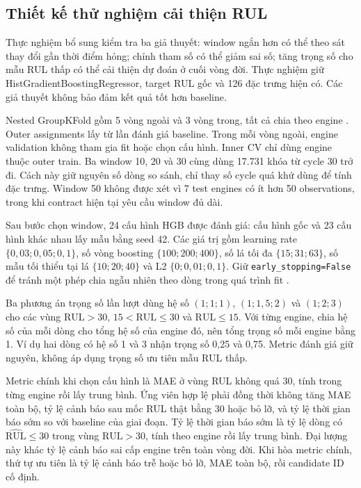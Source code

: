 \subsection{Thiết kế thử nghiệm cải thiện RUL}
\label{sec:rul-improvement-method}

Thực nghiệm bổ sung kiểm tra ba giả thuyết: window ngắn hơn có thể theo sát
thay đổi gần thời điểm hỏng; chỉnh tham số có thể giảm sai số; tăng trọng số
cho mẫu RUL thấp có thể cải thiện dự đoán ở cuối vòng đời. Thực nghiệm giữ
HistGradientBoostingRegressor, target RUL gốc và 126 đặc trưng hiện có.
Các giả thuyết không bảo đảm kết quả tốt hơn baseline.

Nested GroupKFold gồm 5 vòng ngoài và 3 vòng trong, tất cả chia theo engine
\cite{sklearnNestedCV2026,sklearnGroupedCV}.
Outer assignments lấy từ lần đánh giá baseline. Trong mỗi vòng ngoài, engine
validation không tham gia fit hoặc chọn cấu hình. Inner CV chỉ dùng engine
thuộc outer train. Ba window 10, 20 và 30 cùng dùng 17.731 khóa từ cycle 30
trở đi. Cách này giữ nguyên số dòng so sánh, chỉ thay số cycle quá khứ dùng
để tính đặc trưng. Window 50 không được xét vì 7 test engines có ít hơn 50
observations, trong khi contract hiện tại yêu cầu window đủ dài.

Sau bước chọn window, 24 cấu hình HGB được đánh giá: cấu hình gốc và 23 cấu
hình khác nhau lấy mẫu bằng seed 42. Các giá trị gồm learning rate
$\{0{,}03;0{,}05;0{,}1\}$, số vòng boosting $\{100;200;400\}$, số lá tối đa
$\{15;31;63\}$, số mẫu tối thiểu tại lá $\{10;20;40\}$ và L2
$\{0;0{,}01;0{,}1\}$. Giữ \texttt{early\_stopping=False} để tránh một phép
chia ngẫu nhiên theo dòng trong quá trình fit \cite{sklearnHGBAPI2026}.

Ba phương án trọng số lần lượt dùng hệ số $(1;1;1)$, $(1;1{,}5;2)$ và
$(1;2;3)$ cho các vùng $\mathrm{RUL}>30$, $15<\mathrm{RUL}\leq30$ và
$\mathrm{RUL}\leq15$. Với từng engine, chia hệ số của mỗi dòng cho tổng hệ số
của engine đó, nên tổng trọng số mỗi engine bằng 1. Ví dụ hai dòng có hệ số
1 và 3 nhận trọng số 0,25 và 0,75. Metric đánh giá giữ nguyên, không áp dụng
trọng số ưu tiên mẫu RUL thấp.

Metric chính khi chọn cấu hình là MAE ở vùng RUL không quá 30, tính trong
từng engine rồi lấy trung bình. Ứng viên hợp lệ phải đồng thời không tăng
MAE toàn bộ, tỷ lệ cảnh báo sau mốc RUL thật bằng 30 hoặc bỏ lỡ, và tỷ lệ thời
gian báo sớm so với baseline của giai đoạn. Tỷ lệ thời gian báo sớm là tỷ lệ
dòng có $\widehat{\mathrm{RUL}}\leq30$ trong vùng $\mathrm{RUL}>30$, tính theo
engine rồi lấy trung bình. Đại lượng này khác tỷ lệ cảnh báo sai cấp engine
trên toàn vòng đời. Khi hòa metric chính, thứ tự ưu tiên là tỷ lệ cảnh báo
trễ hoặc bỏ lỡ, MAE toàn bộ, rồi candidate ID cố định.

